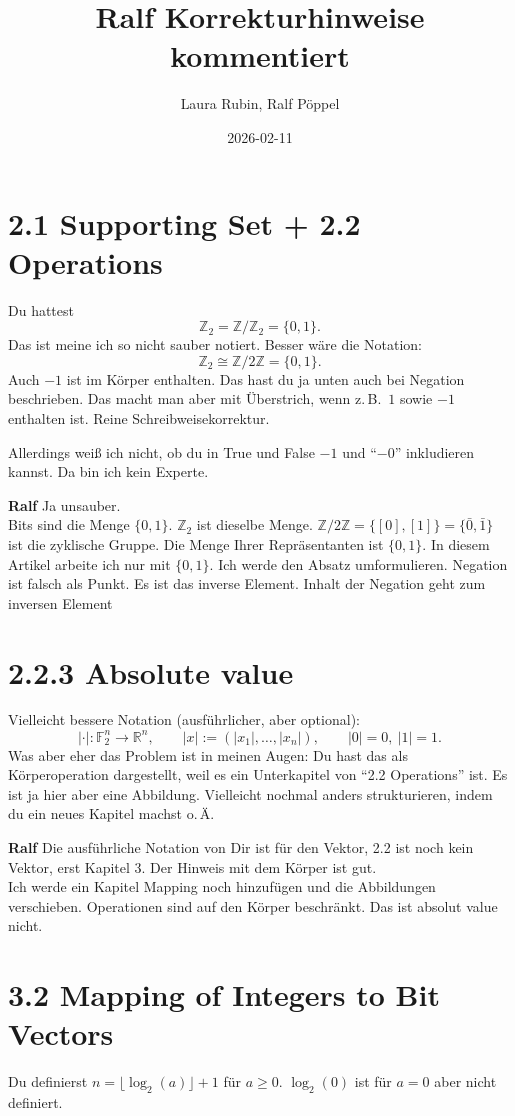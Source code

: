 \documentclass[a4paper]{article}
\title{Ralf Korrekturhinweise kommentiert}
\author{Laura Rubin, Ralf Pöppel}
\date{2026-02-11}
\begin{document}
\maketitle


\section*{2.1 Supporting Set + 2.2 Operations}
Du hattest
\[
  \mathbb{Z}_2 = \mathbb{Z}/\mathbb{Z}_2 = \{0,1\}.
\]
Das ist meine ich so nicht sauber notiert. Besser w\"are die Notation:
\[
  \mathbb{Z}_2 \cong \mathbb{Z}/2\mathbb{Z} = \{0,1\}.
\]
Auch $-1$ ist im K\"orper enthalten. Das hast du ja unten auch bei Negation beschrieben.
Das macht man aber mit \"Uberstrich, wenn z.\,B.\ $1$ sowie $-1$ enthalten ist.
Reine Schreibweisekorrektur.

Allerdings wei\ss{} ich nicht, ob du in True und False $-1$ und ``$-0$'' inkludieren kannst.
Da bin ich kein Experte.

{\bf Ralf} Ja unsauber. \\ Bits sind die Menge $\{0,1 \}$. $\mathbb{Z}_2$ ist dieselbe Menge.
 $\mathbb{Z}/2\mathbb{Z} = \{[0], [1]\} = \{\bar{0}, \bar{1}\}$ ist die zyklische Gruppe. Die Menge Ihrer Repräsentanten ist $\{0, 1\}$.
In diesem Artikel arbeite ich nur mit  $\{0,1 \}$. Ich werde den Absatz umformulieren. 
Negation ist falsch als Punkt. Es ist das inverse Element. Inhalt der Negation geht zum inversen Element

\section*{2.2.3 Absolute value}
Vielleicht bessere Notation (ausf\"uhrlicher, aber optional):
\[
  |\cdot| : \mathbb{F}_2^n \to \mathbb{R}^n,
  \qquad
  |x| := (|x_1|,\ldots,|x_n|),
  \qquad
  |0|=0,\ |1|=1.
\]
Was aber eher das Problem ist in meinen Augen: Du hast das als K\"orperoperation dargestellt,
weil es ein Unterkapitel von ``2.2 Operations'' ist. Es ist ja hier aber eine Abbildung.
Vielleicht nochmal anders strukturieren, indem du ein neues Kapitel machst o.\,\"A.

{\bf Ralf} Die ausführliche Notation von Dir ist für den Vektor, 2.2 ist noch kein Vektor, erst Kapitel 3. Der Hinweis mit dem Körper ist gut. \\
Ich werde ein Kapitel Mapping noch hinzufügen und die Abbildungen verschieben.
Operationen sind auf den Körper beschränkt. Das ist absolut value nicht.

\section*{3.2 Mapping of Integers to Bit Vectors}
Du definierst $n=\lfloor \log_2(a)\rfloor + 1$ f\"ur $a\ge 0$.
$\log_2(0)$ ist f\"ur $a=0$ aber nicht definiert.
\end{document}
